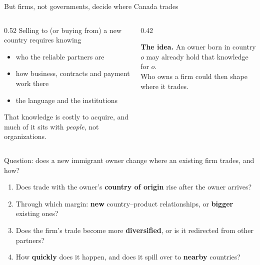 \documentclass[11pt,aspectratio=169,notes]{beamer}
\begin{document}
\begin{frame}{But firms, not governments, decide where Canada trades}
\vspace{0.3cm}
\begin{columns}[T]
\begin{column}{0.52\textwidth}
Selling to (or buying from) a new country requires knowing
\vspace{0.15cm}
\begin{itemize}\setlength{\itemsep}{4pt}
\item who the reliable partners are
\item how business, contracts and payment work there
\item the language and the institutions
\end{itemize}
\vspace{0.2cm}
{\color{inksoft}\small That knowledge is costly to acquire, and much of it sits with \emph{people}, not organizations.}
\end{column}
\begin{column}{0.42\textwidth}
\begin{keybox}
\textbf{The idea.} An owner born in country $o$ may already hold that knowledge for $o$.\\[0.3em]
Who owns a firm could then shape where it trades.
\end{keybox}
\end{column}
\end{columns}
\end{frame}

\begin{frame}{Question: does a new immigrant owner change where an existing firm trades, and how?}
\vspace{0.5cm}
\begin{enumerate}\setlength{\itemsep}{10pt}
\item Does trade with the owner's \textbf{country of origin} rise after the owner arrives?
\item Through which margin: \textbf{new} country--product relationships, or \textbf{bigger} existing ones?
\item Does the firm's trade become more \textbf{diversified}, or is it redirected from other partners?
\item How \textbf{quickly} does it happen, and does it spill over to \textbf{nearby} countries?
\end{enumerate}
\end{frame}
\end{document}
